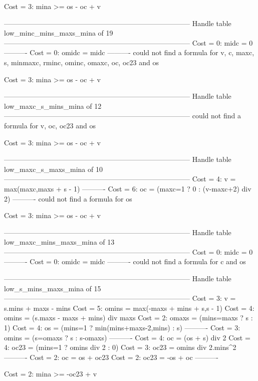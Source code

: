 Cost =  3:  mina >= os - oc + v

--------------------------------------------------------------------------------
Handle table low_minc_mins_maxs_mina of 19
--------------------------------------------------------------------------------
Cost =  0:  midc    = 0
----------
Cost =  0:  omidc   = midc
----------
could not find a formula for v, c, maxc, s, minmaxc, rminc, ominc, omaxc, oc, oc23 and os

Cost =  3:  mina >= os - oc + v

--------------------------------------------------------------------------------
Handle table low_maxc_s_mins_mina of 12
--------------------------------------------------------------------------------
could not find a formula for v, oc, oc23 and os

Cost =  3:  mina >= os - oc + v

--------------------------------------------------------------------------------
Handle table low_maxc_s_maxs_mina of 10
--------------------------------------------------------------------------------
Cost =  4:  v  = max(maxc,maxs + s - 1)
----------
Cost =  6:  oc = (maxc=1 ? 0 : (v-maxc+2) div 2)
----------
could not find a formula for os

Cost =  3:  mina >= os - oc + v

--------------------------------------------------------------------------------
Handle table low_maxc_mins_maxs_mina of 13
--------------------------------------------------------------------------------
Cost =  0:  midc  = 0
----------
Cost =  0:  omidc = midc
----------
could not find a formula for c and os


--------------------------------------------------------------------------------
Handle table low_s_mins_maxs_mina of 15
--------------------------------------------------------------------------------
Cost =  3:  v     = s.mins + maxs - mins
Cost =  5:  omins = max(-maxs + mins + s,s - 1)
Cost =  4:  omins = (s.maxs - maxs + mins) div maxs
Cost =  2:  omaxs = (mins=maxs ? s : 1)
Cost =  4:  os    = (mins=1 ? min(mins+maxs-2,mins) : s)
----------
Cost =  3:  omins = (s=omaxs ? s : s-omaxs)
----------
Cost =  4:  oc    = (os + s) div 2
Cost =  4:  oc23  = (mins=1 ? omins div 2 : 0)
Cost =  3:  oc23  = omins div 2.mins^2
----------
Cost =  2:  oc    = os + oc23
Cost =  2:  oc23  = -os + oc
----------

Cost =  2:  mina >= -oc23 + v
